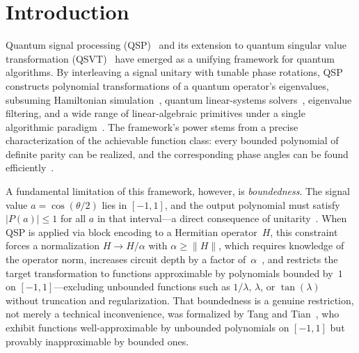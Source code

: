 \section{Introduction}
\label{sec:introduction}


Quantum signal processing
(QSP)~\cite{LowChuang2017,GSLW2019} and its extension to quantum
singular value transformation
(QSVT)~\cite{GSLW2019} have emerged as a unifying framework for
quantum algorithms.  By interleaving a signal unitary with tunable
phase rotations, QSP constructs polynomial transformations of a
quantum operator's eigenvalues, subsuming Hamiltonian
simulation~\cite{LowChuang2017,BerryChildsCleveEtAl2015}, quantum
linear-systems solvers~\cite{HHL2009}, eigenvalue filtering, and a
wide range of linear-algebraic primitives under a single algorithmic
paradigm~\cite{MartynRossiTanChuang2021}.  The framework's power
stems from a precise characterization of the achievable function
class: every bounded polynomial of definite parity can be realized,
and the corresponding phase angles can be found
efficiently~\cite{DongMengWhaleyEtAl2021,Haah2019}.


A fundamental limitation of this framework, however, is
\emph{boundedness}.  The signal value $a = \cos(\theta/2)$ lies in
$[-1,1]$, and the output polynomial must satisfy $|P(a)| \leq 1$ for
all $a$ in that interval---a direct consequence of
unitarity~\cite{LowChuang2017}.  When QSP is applied via block
encoding to a Hermitian operator~$H$, this constraint forces a
normalization $H \to H/\alpha$ with $\alpha \geq \|H\|$, which
requires knowledge of the operator norm, increases circuit depth by a
factor of~$\alpha$~\cite{GSLW2019,MartynRossiTanChuang2021}, and
restricts the target transformation to functions approximable by
polynomials bounded by~$1$ on $[-1,1]$---excluding unbounded functions
such as $1/\lambda$, $\lambda$, or $\tan(\lambda)$ without truncation
and regularization.  That boundedness is a genuine restriction, not merely
a technical inconvenience, was formalized by Tang and
Tian~\cite{TangTian2024}, who exhibit functions well-approximable by
unbounded polynomials on $[-1,1]$ but provably inapproximable by
bounded ones.

